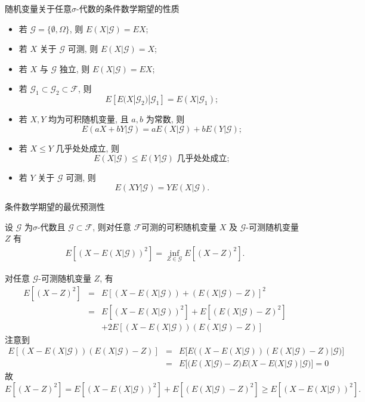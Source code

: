 \documentclass[Prob-All.tex]{subfiles}
\begin{document}
\begin{frame}{随机变量关于任意$\sigma$-代数的条件数学期望的性质}
\begin{itemize}[<+-|alert@+>]
\item 若 $\mathcal{G}=\{\emptyset, \Omega\}$, 则 $E(X|\mathcal{G})=EX$;
\item 若 $X$ 关于 $\mathcal{G}$ 可测, 则 $E(X|\mathcal{G})=X$;
\item 若 $X$ 与 $\mathcal{G}$ 独立, 则 $E(X|\mathcal{G})=EX$;
\item 若 $\mathcal{G}_1\subset \mathcal{G}_2\subset \mathcal{F}$, 则
$$E[E(X|\mathcal{G}_2)|\mathcal{G}_1]=E(X|\mathcal{G}_1);$$
\item 若 $X,Y$ 均为可积随机变量, 且 $a,b$ 为常数, 则
$$E(aX+bY|\mathcal{G})=aE(X|\mathcal{G})+bE(Y|\mathcal{G});$$
\item 若 $X\le Y$ 几乎处处成立, 则
$$E(X|\mathcal{G})\le E(Y|\mathcal{G}) \mbox{ 几乎处处成立};$$
\item 若 $Y$ 关于 $\mathcal{G}$ 可测, 则
$$E(XY|\mathcal{G})=Y E(X|\mathcal{G}).$$
\end{itemize}

\end{frame}

\begin{frame}{条件数学期望的最优预测性}
\begin{thm}
设 $\mathcal{G}$ 为$\sigma$-代数且 $\mathcal{G}\subset\mathcal{F}$, 则对任意 $\mathcal{F}$可测的可积随机变量 $X$ 及 $\mathcal{G}$-可测随机变量 $Z$ 有
{\small \begin{eqnarray*}
	E[(X-E(X|\mathcal{G}))^2]=\inf_{Z\in\mathcal{G}} E[(X-Z)^2].
\end{eqnarray*}}
\end{thm}
\pause
\zheng 对任意 $\mathcal{G}$-可测随机变量 $Z$, 有
{\small \begin{eqnarray*}
	E[(X-Z)^2]&=&E[(X-E(X|\mathcal{G}))+ (E(X|\mathcal{G})-Z)]^2\\
	&=&E[(X-E(X|\mathcal{G}))^2]+E[(E(X|\mathcal{G})-Z)^2]\\
	&&+2E[(X-E(X|\mathcal{G}))(E(X|\mathcal{G})-Z)]
\end{eqnarray*}}
\pause 注意到
{\small \begin{eqnarray*}
	E[(X-E(X|\mathcal{G}))(E(X|\mathcal{G})-Z)]&=&E\bigg[E\big((X-E(X|\mathcal{G}))(E(X|\mathcal{G})-Z)\big|\mathcal{G}\big)\bigg]\\
	&=&E\bigg[(E(X|\mathcal{G})-Z)E\big(X-E(X|\mathcal{G})|\mathcal{G}\big)\bigg]=0
\end{eqnarray*}}
\pause 故  {\small $E[(X-Z)^2]=E[(X-E(X|\mathcal{G}))^2]+E[(E(X|\mathcal{G})-Z)^2]\ge E[(X-E(X|\mathcal{G}))^2].$}
\end{frame}
\end{document}
